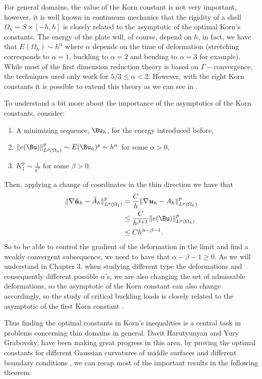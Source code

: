 For general domains, the value of the Korn constant is not very important, however, it is well known in continuum mechanics that the rigidity of a shell $\Omega_h= S\times [-h,h]$ is closely related to the asymptotic of the optimal Korn’s constants. The energy of the plate will, of course, depend on $h$, in fact, we have that $E(\Omega_h)\sim h^\alpha$ where $\alpha$ depends on the time of deformation (stretching corresponds to $\alpha =1$, buckling to $\alpha = 2$ and bending to $\alpha = 3$ for example). While most of the first dimension reduction theory is based on $\Gamma-$convergence, the techniques used only work for $5/3\leq\alpha<2$. However, with the right Korn constants it is possible to extend this theory as we can see in \cite{bib:Fri.Jam.Mue.1}.

To understand a bit more about the importance of the asymptotics of the Korn constants, consider:
\begin{enumerate}
    \item A minimizing sequence, $\Bu_h$, for the energy introduced before,
    \item $\|e(\Bu)\|^p_{L^p(\Omega_h)}\sim E(\Bu_h)^p\sim h^\alpha$ for some $\alpha>0$,
    \item $K_1^p\sim \frac{1}{h^\beta}$ for some $\beta>0$.
\end{enumerate}
Then, applying a change of coordinates in the thin direction we have that 
\begin{align*}
    \|\nabla \boldsymbol{\tilde{u}}_h-\tilde{A}_h\|^p_{L^p(\Omega_1)}&= \frac{C}{h}\|\nabla \boldsymbol{u}_h-A_h\|^p_{L^p(\Omega_h)}\\
    &\leq \frac{C}{h^{\beta+1}}\|e(\Bu)\|^p_{L^p(\Omega_h)}\\
    &\leq C h^{\alpha-\beta-1}.
\end{align*}
So to be able to control the gradient of the deformation in the limit and find a weakly convergent subsequence, we need to have that $\alpha-\beta-1\geq0$. As we will understand in Chapter 3, when studying different type the deformations and consequently different possible $\alpha$'s, we are also changing the set of admissable deformations, so the asymptotic of the Korn constant can also change accordingly, so the study of critical buckling loads is closely related to the asymptotic of the first Korn constant \cite{bib:Gra.Tru.,bib:Gra.Har.2,bib:Gra.Har.3,bib:Harutyunyan.3}. 

Thus finding the optimal constants in Korn’s inequalities is a central task in problems concerning thin domains in general. Davit Harutyunyan and Yury Grabovsky, have been making great progress in this area, by proving the optimal constants for different Gaussian curvatures of middle surfaces and different boundary conditions \cite{bib:Gra.Har.1,bib:Gra.Har.4,bib:Gra.Har.1,bib:Harutyunyan.2}, we can recap most of the important results in the following theorem:

